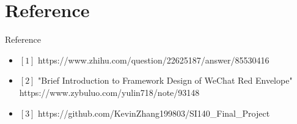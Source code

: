\documentclass[12pt]{beamer}
\begin{document}
\section{Reference}

\begin{frame}{Reference}
	\begin{itemize}
		\item \(\left[ 1\right]\) https://www.zhihu.com/question/22625187/answer/85530416
		\item \(\left[ 2\right]\) "Brief Introduction to Framework Design of WeChat Red Envelope" https://www.zybuluo.com/yulin718/note/93148
		\item \(\left[ 3\right]\) https://github.com/KevinZhang199803/SI140\_Final\_Project
	\end{itemize}
\end{frame}
\end{document}
